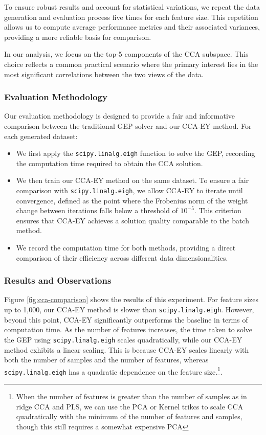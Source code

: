 To ensure robust results and account for statistical variations, we repeat the data generation and evaluation process five times for each feature size. This repetition allows us to compute average performance metrics and their associated variances, providing a more reliable basis for comparison.

In our analysis, we focus on the top-5 components of the CCA subspace. This choice reflects a common practical scenario where the primary interest lies in the most significant correlations between the two views of the data.

\subsubsection{Evaluation Methodology}

Our evaluation methodology is designed to provide a fair and informative comparison between the traditional GEP solver and our CCA-EY method. For each generated dataset:

\begin{itemize}
    \item We first apply the \texttt{scipy.linalg.eigh} function to solve the GEP, recording the computation time required to obtain the CCA solution.
    \item We then train our CCA-EY method on the same dataset. To ensure a fair comparison with \texttt{scipy.linalg.eigh}, we allow CCA-EY to iterate until convergence, defined as the point where the Frobenius norm of the weight change between iterations falls below a threshold of $10^{-5}$. This criterion ensures that CCA-EY achieves a solution quality comparable to the batch method.
    \item We  record the computation time for both methods, providing a direct comparison of their efficiency across different data dimensionalities.
\end{itemize}

\subsubsection{Results and Observations}
Figure \ref{fig:cca-comparison} shows the results of this experiment. For feature sizes up to 1,000, our CCA-EY method is slower than \texttt{scipy.linalg.eigh}. However, beyond this point, CCA-EY significantly outperforms the baseline in terms of computation time.
As the number of features increases, the time taken to solve the GEP using \texttt{scipy.linalg.eigh} scales quadratically, while our CCA-EY method exhibits a linear scaling. This is because CCA-EY scales linearly with both the number of samples and the number of features, whereas \texttt{scipy.linalg.eigh} has a quadratic dependence on the feature size.\footnote{When the number of features is greater than the number of samples as in ridge CCA and PLS, we can use the PCA or Kernel trikcs to scale CCA quadratically with the minimum of the number of features and samples, though this still requires a somewhat expensive PCA}.

